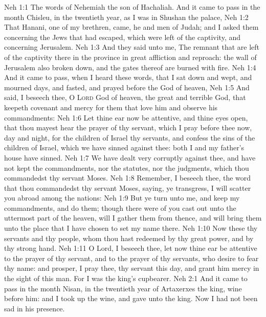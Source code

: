 \vs Neh 1:1 The words of Nehemiah the son of Hachaliah. And it came to pass in the month Chisleu, in the twentieth year, as I was in Shushan the palace,
\vs Neh 1:2 That Hanani, one of my brethren, came, he and  men of Judah; and I asked them concerning the Jews that had escaped, which were left of the captivity, and concerning Jerusalem.
\vs Neh 1:3 And they said unto me, The remnant that are left of the captivity there in the province  in great affliction and reproach: the wall of Jerusalem also  broken down, and the gates thereof are burned with fire.
\vs Neh 1:4 And it came to pass, when I heard these words, that I sat down and wept, and mourned  days, and fasted, and prayed before the God of heaven,
\vs Neh 1:5 And said, I beseech thee, O \textsc{Lord} God of heaven, the great and terrible God, that keepeth covenant and mercy for them that love him and observe his commandments:
\vs Neh 1:6 Let thine ear now be attentive, and thine eyes open, that thou mayest hear the prayer of thy servant, which I pray before thee now, day and night, for the children of Israel thy servants, and confess the sins of the children of Israel, which we have sinned against thee: both I and my father's house have sinned.
\vs Neh 1:7 We have dealt very corruptly against thee, and have not kept the commandments, nor the statutes, nor the judgments, which thou commandedst thy servant Moses.
\vs Neh 1:8 Remember, I beseech thee, the word that thou commandedst thy servant Moses, saying,  ye transgress, I will scatter you abroad among the nations:
\vs Neh 1:9 But  ye turn unto me, and keep my commandments, and do them; though there were of you cast out unto the uttermost part of the heaven,  will I gather them from thence, and will bring them unto the place that I have chosen to set my name there.
\vs Neh 1:10 Now these  thy servants and thy people, whom thou hast redeemed by thy great power, and by thy strong hand.
\vs Neh 1:11 O Lord, I beseech thee, let now thine ear be attentive to the prayer of thy servant, and to the prayer of thy servants, who desire to fear thy name: and prosper, I pray thee, thy servant this day, and grant him mercy in the sight of this man. For I was the king's cupbearer.
\vs Neh 2:1 And it came to pass in the month Nisan, in the twentieth year of Artaxerxes the king,  wine  before him: and I took up the wine, and gave  unto the king. Now I had not been  sad in his presence.
